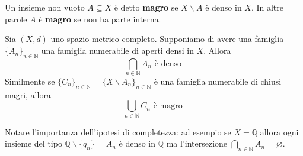 \begin{definition}
    Un insieme non vuoto \(A \subseteq X \) è detto \textbf{magro} se \(X \smallsetminus A\) è denso in \(X\). In
    altre parole \(A\) è \textbf{magro} se non ha parte interna.
\end{definition}

\begin{theorem}[Baire]
    Sia \((X, d)\) uno spazio metrico completo.
Supponiamo di avere una famiglia \(\{A_n\}_{n \in  \mathbb{N}}\) una famiglia
numerabile di aperti densi in \(X\). Allora 
\[
    \bigcap_{n \in \mathbb{N}}A_n \text{ è denso }
\]
Similmente se \(\{C_n\}_{n \in \mathbb{N}} = \{X \smallsetminus A_n\}_{n \in
\mathbb{N}}  \) è una famiglia numerabile di chiusi magri, allora 
\[
    \bigcup_{n \in \mathbb{N}} C_n \text{ è magro }
\]
\end{theorem}
Notare l'importanza dell'ipotesi di completezza: ad esempio se \(X =
\mathbb{Q}\) allora ogni insieme del tipo \(\mathbb{Q} \smallsetminus \{q_n\} =
A_n\) è denso in \(\mathbb{Q}\) ma l'intersezione \(\bigcap_{n \in \mathbb{N}}
A_n = \varnothing\).
